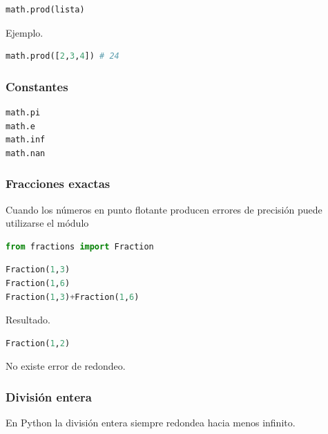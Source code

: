 \begin{lstlisting}[language=Python]
math.prod(lista)
\end{lstlisting}

Ejemplo.

\begin{lstlisting}[language=Python]
math.prod([2,3,4]) # 24
\end{lstlisting}

\vspace{0.3cm}

\subsubsection{Constantes}

\begin{lstlisting}[language=Python]
math.pi
math.e
math.inf
math.nan
\end{lstlisting}

\vspace{0.3cm}

\subsubsection{Fracciones exactas}

Cuando los números en punto flotante producen errores de precisión puede utilizarse el módulo

\begin{lstlisting}[language=Python]
from fractions import Fraction
\end{lstlisting}

\begin{lstlisting}[language=Python]
Fraction(1,3)
Fraction(1,6)
Fraction(1,3)+Fraction(1,6)
\end{lstlisting}

Resultado.

\begin{lstlisting}[language=Python]
Fraction(1,2)
\end{lstlisting}

No existe error de redondeo.

\vspace{0.3cm}

\subsubsection{División entera}

En Python la división entera siempre redondea hacia menos infinito.

